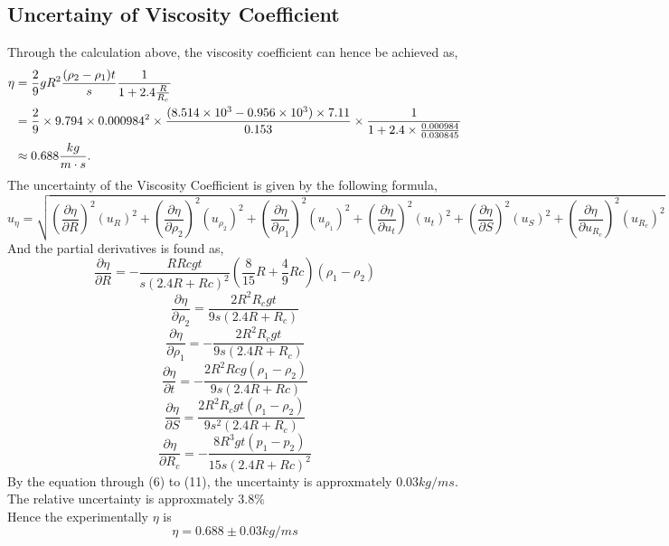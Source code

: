 \documentclass[12pt]{article}
\begin{document}
    \subsection{Uncertainy of Viscosity Coefficient}
    Through the calculation above, the viscosity coefficient can hence be achieved as,
    \[
    \begin{split}
    \centering
        \eta&=\frac{2}{9}gR^2\frac{(\rho_2-\rho_1)t}{s}\frac{1}{1+2.4\frac{R}{R_c}}\\
            &=\frac{2}{9}\times 9.794\times 0.000984^2\times \frac{(8.514\times 10^3-0.956\times10^{3})\times 7.11}{0.153}\times \frac{1}{1+2.4\times \frac{0.000984}{0.030845}}\\
            &\approx 0.688\frac{kg}{m\cdot s}.
    \end{split}
    \]
    The uncertainty of the Viscosity Coefficient is given by the following formula,
    $$u_{\eta}=\sqrt{(\frac{\partial\eta}{\partial R})^2(u_R)^2+(\frac{\partial\eta}{\partial \rho_2})^2(u_{\rho_2})^2+(\frac{\partial\eta}{\partial \rho_1})^2(u_{\rho_1})^2+(\frac{\partial\eta}{\partial u_t})^2(u_t)^2+(\frac{\partial\eta}{\partial S})^2(u_S)^2+(\frac{\partial\eta}{\partial u_{R_c}})^2(u_{R_c})^2}$$
    And the partial derivatives is found as,
    \begin{equation}
            \frac{\partial\eta}{\partial R}=- \frac{R Rc g t}{s \left(2.4 R + Rc\right)^{2}} \left(\frac{8}{15} R + \frac{4}{9}Rc\right) \left(\rho_{1} - \rho_{2}\right)
    \end{equation}
    \begin{equation}
            \frac{\partial\eta}{\partial \rho_2} = \frac{2 R^{2} R_c g t}{9s \left(2.4 R + R_c\right)}
    \end{equation}
    \begin{equation}
            \frac{\partial\eta}{\partial \rho_1} = - \frac{2 R^{2} R_c g t}{9s \left(2.4 R + R_c\right)}
    \end{equation}
    \begin{equation}
            \frac{\partial\eta}{\partial t} = - \frac{2 R^{2} Rc g \left(\rho_{1} - \rho_{2}\right)}{9 s \left(2.4 R + Rc\right)}
    \end{equation}
    \begin{equation}
            \frac{\partial\eta}{\partial S} = \frac{2 R^{2} R_c g t \left(\rho_{1} - \rho_{2}\right)}{9 s^{2} \left(2.4 R + R_c\right)}
    \end{equation}
    \begin{equation}
            \frac{\partial\eta}{\partial R_c} = - \frac{8 R^{3} g t \left(p_{1} - p_{2}\right)}{15 s \left(2.4 R + Rc\right)^{2}}
    \end{equation}
    By the equation through (6) to (11), the uncertainty is approxmately $0.03kg/m s$.
    The relative uncertainty is approxmately $3.8\%$\\
    Hence the experimentally $\eta$ is
    $$\eta = 0.688 \pm 0.03 kg/m s$$
\end{document}
